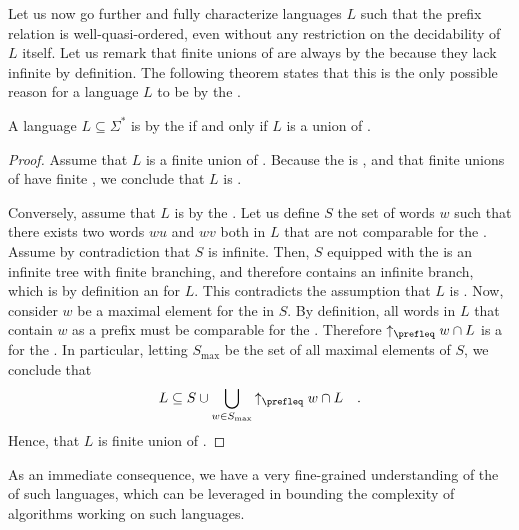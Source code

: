Let us now go further and fully characterize languages $L$ such that the
prefix relation is well-quasi-ordered, even without any restriction on the
decidability of $L$ itself. Let us remark that finite unions of  are
always  by the  because they lack
infinite  by definition. The following theorem states that this
is the only possible reason for a language $L$ to be  by
the .

\begin{theorem}
    \label{prefixes:thm}
    A language $L \subseteq \Sigma^*$ is  by the
     if and only if $L$ is a union of .
\end{theorem}
\begin{proof}
    Assume that $L$ is a finite union of .
    Because the  is ,
    and that finite unions of  have finite ,
    we conclude that $L$ is .

    Conversely, assume that $L$ is  by the . Let us define $S$ the set of words $w$ such that there exists
    two words $wu$ and $wv$ both in $L$ that are not comparable for the
    . Assume by contradiction that $S$ is infinite.
    Then, $S$ equipped with the  is an infinite
    tree with finite branching, and therefore contains an infinite
    branch, which is by definition an  for $L$.
    This contradicts the assumption that $L$ is .
    Now, consider $w$ be a maximal element for the 
    in $S$. By definition, all words in $L$ that contain $w$ as a prefix
    must be comparable for the . Therefore
    $\upset[\prefleq]{w} \cap L$ is a  for the .
    In particular, letting $S_{\max}$ be the set of all maximal elements
    of $S$,
    we conclude that 
    \begin{equation*}
        L \subseteq S \cup \bigcup_{w \in S_{\max}} \upset[\prefleq]{w} \cap L
        \quad .
    \end{equation*}
    Hence, that $L$ is finite union of .
\end{proof}

As an immediate consequence, we have a very fine-grained understanding of the
 of such  languages, which can be
leveraged in bounding the complexity of algorithms working on such languages.

